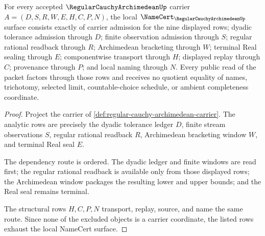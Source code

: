 \begin{theorem}
\label{thm:regular-cauchy-archimedean-namecert-obligations}
For every accepted $\RegularCauchyArchimedeanUp$ carrier $A=(D,S,R,W,E,H,C,P,N)$, the local $\NameCert_{\RegularCauchyArchimedeanUp}$ surface consists exactly of carrier admission for the nine displayed rows; dyadic tolerance admission through $D$; finite observation admission through $S$; regular rational readback through $R$; Archimedean bracketing through $W$; terminal Real sealing through $E$; componentwise transport through $H$; displayed replay through $C$; provenance through $P$; and local naming through $N$. Every public read of the packet factors through those rows and receives no quotient equality of names, trichotomy, selected limit, countable-choice schedule, or ambient completeness coordinate.
\end{theorem}
\begin{proof}
Project the carrier of \autoref{def:regular-cauchy-archimedean-carrier}. The analytic rows are precisely the dyadic tolerance ledger $D$, finite stream observations $S$, regular rational readback $R$, Archimedean bracketing window $W$, and terminal Real seal $E$.

The dependency route is ordered. The dyadic ledger and finite windows are read first; the regular rational readback is available only from those displayed rows; the Archimedean window packages the resulting lower and upper bounds; and the Real seal remains terminal.

The structural rows $H,C,P,N$ transport, replay, source, and name the same route. Since none of the excluded objects is a carrier coordinate, the listed rows exhaust the local NameCert surface.
\end{proof}

